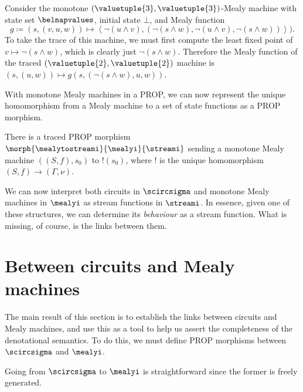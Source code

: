 \begin{example}\label{ex:trace-mealy}
    Consider the monotone \((\valuetuple{3},\valuetuple{3})\)-Mealy machine with
    state set \(\belnapvalues\), initial state \(\bot\), and Mealy function \[
        g \coloneqq (s, (v, u, w))
        \mapsto \left\langle
                \neg(u \land v),
                (\neg(s \land w), \neg(u \land v), \neg(s \land w))
        \right\rangle
    ).\]
    To take the trace of this machine, we must first compute the least fixed
    point of \(v \mapsto \neg(s \land w)\), which is clearly just
    \(\neg(s \land w)\).
    Therefore the Mealy function of the traced
    \((\valuetuple{2}, \valuetuple{2})\) machine is \(
        (s, (u, w)) \mapsto g(s, (\neg(s \land w), u, w))
    \).
\end{example}

With monotone Mealy machines in a PROP, we can now represent the unique
homomorphism from a Mealy machine to a set of state functions as a PROP
morphism.

\begin{proposition}
    There is a traced PROP morphism
    \(\morph{\mealytostreami}{\mealyi}{\streami}\) sending a monotone Mealy
    machine \(\left((S, f), s_0\right)\) to \(!(s_0)\), where \(!\) is the
    unique homomorphism \((S,f) \to (\Gamma,\nu)\).
\end{proposition}

We can now interpret both circuits in \(\scircsigma\) and monotone Mealy
machines in \(\mealyi\) as stream functions in \(\streami\).
In essence, given one of these structures, we can determine its \emph{behaviour}
as a stream function.
What is missing, of course, is the links between them.

\section{Between circuits and Mealy machines}

The main result of this section is to establish the links between circuits
and Mealy machines, and use this as a tool to help us assert the completeness of
the denotational semantics.
To do this, we must define PROP morphisms between \(\scircsigma\) and
\(\mealyi\).

Going from \(\scircsigma\) to \(\mealyi\) is straightforward since the former
is freely generated.

